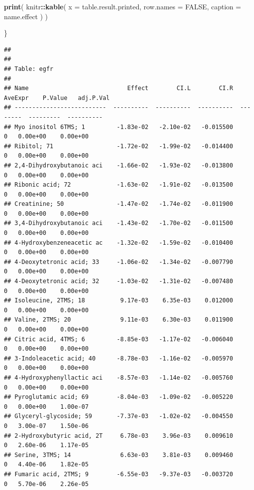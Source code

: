 \documentclass[]{article}
\newenvironment{Shaded}{\begin{snugshade}}{\end{snugshade}}
\newcommand{\DataTypeTok}[1]{\textcolor[rgb]{0.13,0.29,0.53}{#1}}
\newcommand{\KeywordTok}[1]{\textcolor[rgb]{0.13,0.29,0.53}{\textbf{#1}}}
\newcommand{\NormalTok}[1]{#1}
\newcommand{\OperatorTok}[1]{\textcolor[rgb]{0.81,0.36,0.00}{\textbf{#1}}}
\newcommand{\OtherTok}[1]{\textcolor[rgb]{0.56,0.35,0.01}{#1}}
\begin{document}
\begin{Shaded}
\begin{Highlighting}[]
  \KeywordTok{print}\NormalTok{( }
\NormalTok{    knitr}\OperatorTok{::}\KeywordTok{kable}\NormalTok{( }
      \DataTypeTok{x =}\NormalTok{ table.result.printed,}
      \DataTypeTok{row.names =} \OtherTok{FALSE}\NormalTok{,}
      \DataTypeTok{caption =}\NormalTok{ name.effect}
\NormalTok{    )}
\NormalTok{  )}
  
\NormalTok{\}}
\end{Highlighting}
\end{Shaded}

\begin{verbatim}
## 
## 
## Table: egfr
## 
## Name                            Effect        CI.L        CI.R   AveExpr    P.Value   adj.P.Val
## --------------------------  ----------  ----------  ----------  --------  ---------  ----------
## Myo inositol 6TMS; 1         -1.83e-02   -2.10e-02   -0.015500         0   0.00e+00    0.00e+00
## Ribitol; 71                  -1.72e-02   -1.99e-02   -0.014400         0   0.00e+00    0.00e+00
## 2,4-Dihydroxybutanoic aci    -1.66e-02   -1.93e-02   -0.013800         0   0.00e+00    0.00e+00
## Ribonic acid; 72             -1.63e-02   -1.91e-02   -0.013500         0   0.00e+00    0.00e+00
## Creatinine; 50               -1.47e-02   -1.74e-02   -0.011900         0   0.00e+00    0.00e+00
## 3,4-Dihydroxybutanoic aci    -1.43e-02   -1.70e-02   -0.011500         0   0.00e+00    0.00e+00
## 4-Hydroxybenzeneacetic ac    -1.32e-02   -1.59e-02   -0.010400         0   0.00e+00    0.00e+00
## 4-Deoxytetronic acid; 33     -1.06e-02   -1.34e-02   -0.007790         0   0.00e+00    0.00e+00
## 4-Deoxytetronic acid; 32     -1.03e-02   -1.31e-02   -0.007480         0   0.00e+00    0.00e+00
## Isoleucine, 2TMS; 18          9.17e-03    6.35e-03    0.012000         0   0.00e+00    0.00e+00
## Valine, 2TMS; 20              9.11e-03    6.30e-03    0.011900         0   0.00e+00    0.00e+00
## Citric acid, 4TMS; 6         -8.85e-03   -1.17e-02   -0.006040         0   0.00e+00    0.00e+00
## 3-Indoleacetic acid; 40      -8.78e-03   -1.16e-02   -0.005970         0   0.00e+00    0.00e+00
## 4-Hydroxyphenyllactic aci    -8.57e-03   -1.14e-02   -0.005760         0   0.00e+00    0.00e+00
## Pyroglutamic acid; 69        -8.04e-03   -1.09e-02   -0.005220         0   0.00e+00    1.00e-07
## Glyceryl-glycoside; 59       -7.37e-03   -1.02e-02   -0.004550         0   3.00e-07    1.50e-06
## 2-Hydroxybutyric acid, 2T     6.78e-03    3.96e-03    0.009610         0   2.60e-06    1.17e-05
## Serine, 3TMS; 14              6.63e-03    3.81e-03    0.009460         0   4.40e-06    1.82e-05
## Fumaric acid, 2TMS; 9        -6.55e-03   -9.37e-03   -0.003720         0   5.70e-06    2.26e-05

\end{verbatim}
\end{document}
